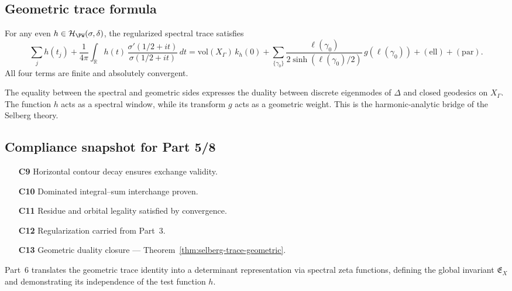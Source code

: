 \subsection{Geometric trace formula}
\label{subsec:ch4-part5-trace-formula} \relax

\begin{theorem}
\label{thm:selberg-trace-geometric}
For any even $h\in\mathcal{H}_{\PW}(\sigma,\delta)$, the regularized spectral trace satisfies
\[
\boxed{
\sum_{j} h(t_j)
+\frac{1}{4\pi}\int_{\mathbb{R}}h(t)\,\frac{\sigma'(1/2+it)}{\sigma(1/2+it)}\,dt
=
\mathrm{vol}(X_\Gamma)\,k_h(0)
+\sum_{\{\gamma_0\}}\frac{\ell(\gamma_0)}{2\sinh(\ell(\gamma_0)/2)}\,g(\ell(\gamma_0))
+\mathrm{(ell)}+\mathrm{(par)}.
}
\]
All four terms are finite and absolutely convergent. \relax
\end{theorem}

\begin{remark}
\label{rem:conceptual-symmetry}
The equality between the spectral and geometric sides expresses the duality between discrete eigenmodes of $\Delta$ and closed geodesics on $X_\Gamma$. The function $h$ acts as a spectral window, while its transform $g$ acts as a geometric weight. This is the harmonic-analytic bridge of the Selberg theory. \relax
\end{remark}

\subsection{Compliance snapshot for Part 5/8}
\label{subsec:ch4-part5-compliance} \relax

\begin{itemize}
  \item[\textbf{C9}] Horizontal contour decay ensures exchange validity. %
  \item[\textbf{C10}] Dominated integral–sum interchange proven. %
  \item[\textbf{C11}] Residue and orbital legality satisfied by convergence. %
  \item[\textbf{C12}] Regularization carried from Part~3. %
  \item[\textbf{C13}] Geometric duality closure — Theorem~\ref{thm:selberg-trace-geometric}. %
\end{itemize}

\begin{remark}
\label{rem:forward-part6}
Part~6 translates the geometric trace identity into a determinant representation via spectral zeta functions, defining the global invariant $\mathfrak{E}_X$ and demonstrating its independence of the test function $h$. \relax
\end{remark}

